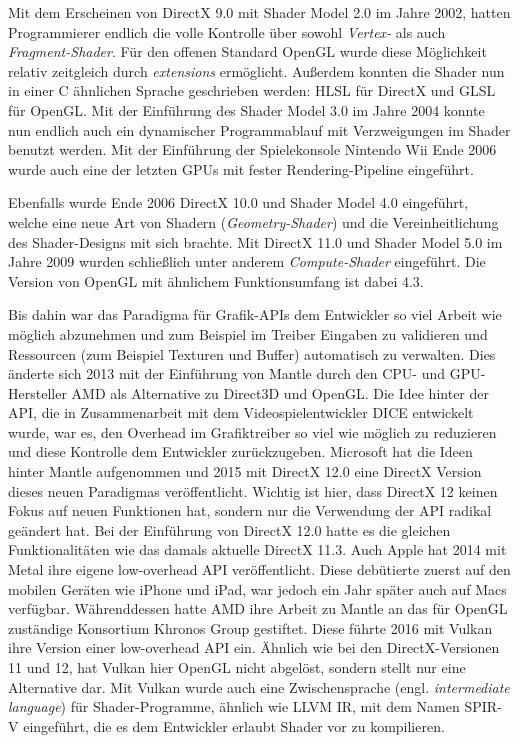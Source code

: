 \documentclass[oneside]{ausarbeitung}
\newcommand*{\quotize}[1]{\glqq #1\grqq}
\begin{document}
Mit dem Erscheinen von DirectX 9.0 mit Shader Model 2.0 im Jahre 2002, hatten Programmierer endlich die volle Kontrolle über sowohl \textit{Vertex-} als auch \textit{Fragment-Shader}. Für den offenen Standard OpenGL wurde diese Möglichkeit relativ zeitgleich durch \textit{extensions} ermöglicht. Außerdem konnten die Shader nun in einer C ähnlichen Sprache geschrieben werden: \ac{HLSL} \cite{wikipedia:hlsl} für DirectX und \ac{GLSL} \cite{wikipedia:hlsl} für OpenGL. Mit der Einführung des Shader Model 3.0 im Jahre 2004 konnte nun endlich auch ein dynamischer Programmablauf mit Verzweigungen im Shader benutzt werden. Mit der Einführung der Spielekonsole Nintendo Wii Ende 2006 wurde auch eine der letzten \ac{GPU}s mit fester Rendering-Pipeline eingeführt. 

Ebenfalls wurde Ende 2006 DirectX 10.0 und Shader Model 4.0 eingeführt, welche eine neue Art von Shadern (\textit{Geometry-Shader}) und die Vereinheitlichung des Shader-Designs mit sich brachte. Mit DirectX 11.0 und Shader Model 5.0 im Jahre 2009 wurden schließlich unter anderem \textit{Compute-Shader} eingeführt. Die Version von OpenGL mit ähnlichem Funktionsumfang ist dabei 4.3.

Bis dahin war das Paradigma für Grafik-APIs dem Entwickler so viel Arbeit wie möglich abzunehmen und zum Beispiel im Treiber Eingaben zu validieren und Ressourcen (zum Beispiel Texturen und Buffer) automatisch zu verwalten. Dies änderte sich 2013 mit der Einführung von Mantle durch den \ac{CPU}- und \ac{GPU}- Hersteller \ac{AMD} als Alternative zu Direct3D und OpenGL. Die Idee hinter der API, die in Zusammenarbeit mit dem Videospielentwickler DICE entwickelt wurde, war es, den Overhead im Grafiktreiber so viel wie möglich zu reduzieren und diese Kontrolle dem Entwickler zurückzugeben. Microsoft hat die Ideen hinter Mantle aufgenommen und 2015 mit DirectX 12.0 eine DirectX Version dieses neuen Paradigmas veröffentlicht. Wichtig ist hier, dass DirectX 12 keinen Fokus auf neuen Funktionen hat, sondern nur die Verwendung der API radikal geändert hat. Bei der Einführung von DirectX 12.0 hatte es die gleichen Funktionalitäten wie das damals aktuelle DirectX 11.3. Auch Apple hat 2014 mit Metal ihre eigene \quotize{low-overhead} API veröffentlicht. Diese debütierte zuerst auf den mobilen Geräten wie iPhone und iPad, war jedoch ein Jahr später auch auf Macs verfügbar. Währenddessen hatte AMD ihre Arbeit zu Mantle an das für OpenGL zuständige Konsortium Khronos Group gestiftet. Diese führte 2016 mit Vulkan ihre Version einer \quotize{low-overhead} API ein. Ähnlich wie bei den DirectX-Versionen 11 und 12, hat Vulkan hier OpenGL nicht abgelöst, sondern stellt nur eine Alternative dar. Mit Vulkan wurde auch eine Zwischensprache (engl. \textit{intermediate language}) für Shader-Programme, ähnlich wie LLVM IR, mit dem Namen SPIR-V eingeführt, die es dem Entwickler erlaubt Shader vor zu kompilieren.
\end{document}

